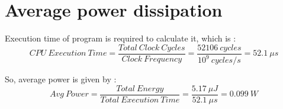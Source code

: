 \documentclass[]{article}
\begin{document}
\section{Average power dissipation}
\Large
Execution time of program is required to calculate it, which is :
\[CPU\ Execution\ Time = \frac{Total\ Clock\ Cycles}{Clock\ Frequency} = \frac{52106\ cycles}{10^{9}\ cycles/s} = \boxed{52.1\ \mu s}\]

So, average power is given by :
\[Avg\ Power = \frac{Total\ Energy}{Total\ Execution\ Time} = \frac{5.17\ \mu J}{52.1\ \mu s} = \boxed{0.099\ W}\]
\end{document}
